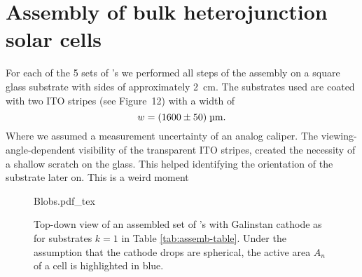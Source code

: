 \documentclass[a4paper,10pt,twocolumn]{article}
\begin{document}
\begin{extract*}
\begin{table}[h]
\begin{tabular}{@{}ccccccc@{}}
	\end{tabular}
\end{table}

\section{Assembly of bulk heterojunction solar cells}\label{sec:assembly}
For each of the 5 sets of \BHSC's we performed all steps of the assembly on a square glass substrate with sides of approximately 2~cm. The substrates used are coated with two ITO stripes (see \cite{labdesc} Figure~12) with a width of
\begin{equation*}
w = (1600\pm50)\;\text{\textmu m}.
\end{equation*}
Where we assumed a measurement uncertainty of an analog caliper. The viewing-angle-dependent visibility of the transparent ITO stripes, created the necessity of a shallow scratch on the glass. This helped identifying the orientation of the substrate later on.\mypar
This is a weird moment

\begin{figure}[h]\centering
	{Blobs.pdf_tex}
	\caption{Top-down view of an assembled set of \BHSC's with Galinstan cathode as for substrates $k=1$ in Table \ref{tab:assemb-table}. Under the assumption that the cathode drops are spherical, the active area $A_n$ of a cell is highlighted in blue.}
	\label{fig:blobs}
\end{figure}


\end{extract*}
\end{document}

